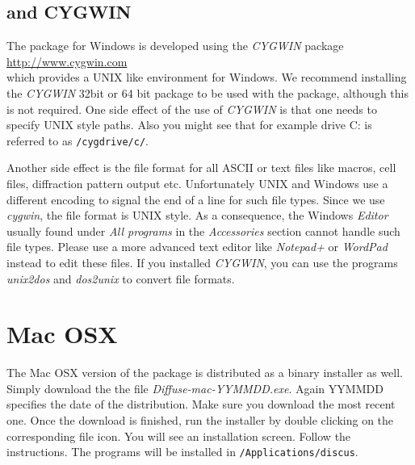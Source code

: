 \subsection{\Discus and CYGWIN}

The \Discus package for Windows is developed using the \textit{CYGWIN} 
package \\ \url{http://www.cygwin.com} \\
which provides a UNIX like environment 
for Windows. We recommend installing the \textit{CYGWIN} 32bit or 64 bit 
package to be used 
with the \Discus package, although this is not required. One side effect of 
the use of \textit{CYGWIN} is that one needs to specify UNIX style paths. 
Also you might see that for example drive C: is  referred to as 
{\tt /cygdrive/c/}.

Another side effect is the file format for all ASCII or text files like
macros, cell files, diffraction pattern output etc. Unfortunately UNIX and
Windows use a different encoding to signal the end of a line for such file types.
Since we use \textit{cygwin}, the file format is UNIX style. As a consequence,
the Windows \textit{Editor} usually found under \textit{All programs} 
in the \textit{Accessories} section cannot handle such
file types. Please use a more advanced text editor like \textit{Notepad+} 
or \textit{WordPad} instead to edit these files.
If you installed \textit{CYGWIN}, you can use the programs \textit{unix2dos}
and \textit{dos2unix} to convert file formats.


\section{Mac OSX\label{appa-bmac}}

The Mac OSX version of the \Discus package is distributed as a binary
installer as well. Simply download the the file {\it Diffuse-mac-YYMMDD.exe}. 
Again YYMMDD specifies the date of the distribution. Make sure you 
download the most recent one. Once the download is finished, run the 
installer by double clicking on the corresponding file icon. You will see 
an installation screen. Follow
the instructions. The programs will be installed in {\tt /Applications/discus}.
%

